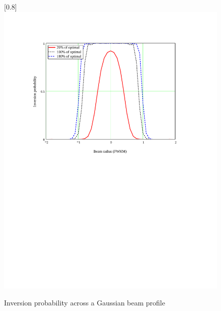 \begin{figure}
\scalebox{0.8}[0.8]{
\includegraphics[bb=25 400 489 700]
{gaussian/gaussian.pdf}
}
\caption{Inversion probability across a Gaussian beam profile}
\label{gaussian}
\end{figure}
